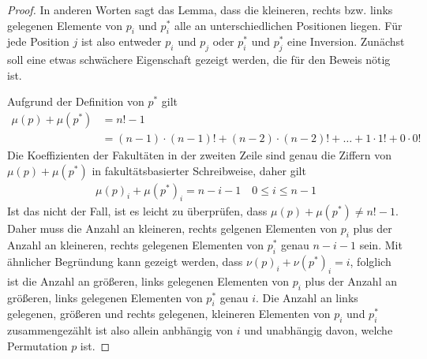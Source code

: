 \documentclass[a4paper, 10pt, ngerman]{article}
\begin{document}
\begin{proof}
    In anderen Worten sagt das Lemma, dass die kleineren, rechts bzw. links gelegenen Elemente von $p_i$ und $p^*_i$ alle an unterschiedlichen Positionen liegen. Für jede Position $j$ ist also entweder $p_i$ und $p_j$ oder $p^*_i$ und $p^*_j$ eine Inversion. Zunächst soll eine etwas schwächere Eigenschaft gezeigt werden, die für den Beweis nötig ist.

    Aufgrund der Definition von $p^*$ gilt
    \begin{align*}
        \mu(p) + \mu(p^*) & = n! - 1                                                                           \\
                          & =(n - 1) \cdot (n - 1)! + (n - 2) \cdot (n - 2)! + \dots + 1 \cdot 1! + 0 \cdot 0!
    \end{align*}
    Die Koeffizienten der Fakultäten in der zweiten Zeile sind genau die Ziffern von $\mu(p) + \mu(p^*)$ in fakultätsbasierter Schreibweise, daher gilt
    \begin{align*}
        \mu(p)_i + \mu(p^*)_i = n - i - 1 \quad 0 \le i \le n - 1
    \end{align*}
    Ist das nicht der Fall, ist es leicht zu überprüfen, dass $\mu(p) + \mu(p^*) \ne n! - 1$. Daher muss die Anzahl an kleineren, rechts gelgenen Elementen von $p_i$ plus der Anzahl an kleineren, rechts gelegenen Elementen von $p^*_i$ genau $n-i-1$ sein. Mit ähnlicher Begründung kann gezeigt werden, dass $\nu(p)_i + \nu(p^*)_i = i$, folglich ist die Anzahl an größeren, links gelegenen Elementen von $p_i$ plus der Anzahl an größeren, links gelegenen Elementen von $p^*_i$ genau $i$. Die Anzahl an links gelegenen, größeren und rechts gelegenen, kleineren Elementen von $p_i$ und $p^*_i$ zusammengezählt ist also allein anbhängig von $i$ und unabhängig davon, welche Permutation $p$ ist.


\end{proof}
\end{document}
